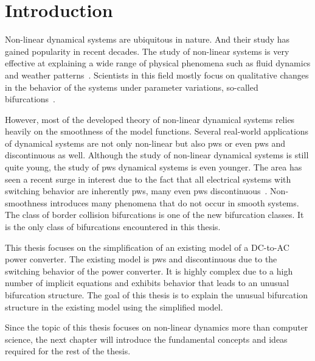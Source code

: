 \chapter{Introduction}
\label{chap:intro}

Non-linear dynamical systems are ubiquitous in nature.
And their study has gained popularity in recent decades.
The study of non-linear systems is very effective at explaining a wide range of physical phenomena such as fluid dynamics and weather patterns~\cite{bernardo2008piecewise}.
Scientists in this field mostly focus on qualitative changes in the behavior of the systems under parameter variations, so-called bifurcations~\cite{simpson2010}.

However, most of the developed theory of non-linear dynamical systems relies heavily on the smoothness of the model functions.
Several real-world applications of dynamical systems are not only non-linear but also \gls{pws} or even \gls{pws} and discontinuous as well.
Although the study of non-linear dynamical systems is still quite young, the study of \gls{pws} dynamical systems is even younger.
The area has seen a recent surge in interest due to the fact that all electrical systems with switching behavior are inherently \gls{pws}, many even \gls{pws} discontinuous~\cite{simpson2010}.
Non-smoothness introduces many phenomena that do not occur in smooth systems.
The class of border collision bifurcations is one of the new bifurcation classes.
It is the only class of bifurcations encountered in this thesis.

This thesis focuses on the simplification of an existing model of a DC-to-AC power converter.
The existing model is \gls{pws} and discontinuous due to the switching behavior of the power converter.
It is highly complex due to a high number of implicit equations and exhibits behavior that leads to an unusual bifurcation structure.
The goal of this thesis is to explain the unusual bifurcation structure in the existing model using the simplified model.

Since the topic of this thesis focuses on non-linear dynamics more than computer science, the next chapter will introduce the fundamental concepts and ideas required for the rest of the thesis.
